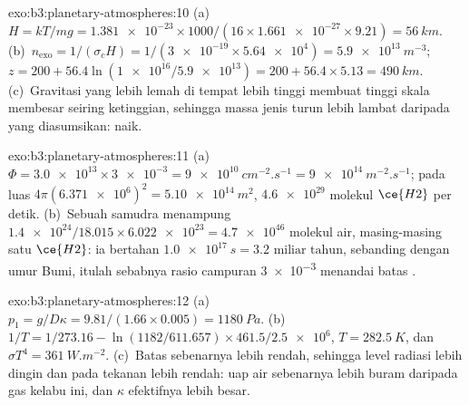 \begin{solution}{exo:b3:planetary-atmospheres:10}
(a)~$H = kT/mg = \num{1.381e-23}\times1000/(16\times\num{1.661e-27}\times9.21)
= \qty{56}{km}$. (b)~$n_\mathrm{exo} = 1/(\sigma_c H) = 1/(\num{3e-19}\times
\num{5.64e4}) = \qty{5.9e13}{m^{-3}}$; $z = 200 + 56.4\ln(\num{1e16}/
\num{5.9e13}) = 200 + 56.4\times5.13 = \qty{490}{km}$. (c)~Gravitasi yang lebih lemah
di tempat lebih tinggi membuat tinggi skala membesar seiring ketinggian, sehingga massa jenis
turun lebih lambat daripada yang diasumsikan:  naik.
\end{solution}

\begin{solution}{exo:b3:planetary-atmospheres:11}
(a)~$\Phi = \num{3.0e13}\times\num{3e-3} = \qty{9e10}{cm^{-2}.s^{-1}} =
\qty{9e14}{m^{-2}.s^{-1}}$; pada luas $4\pi(\num{6.371e6})^2 =
\qty{5.10e14}{m^2}$, $\num{4.6e29}$ molekul $\ce{H2}$ per detik.
(b)~Sebuah samudra menampung $\num{1.4e24}/18.015\times\num{6.022e23} =
\num{4.7e46}$ molekul air, masing-masing satu $\ce{H2}$: ia bertahan
$\qty{1.0e17}{s} = \num{3.2}\text{ miliar tahun}$, sebanding dengan umur
Bumi, itulah sebabnya rasio campuran \num{3e-3} menandai batas .
\end{solution}

\begin{solution}{exo:b3:planetary-atmospheres:12}
(a)~$p_1 = g/D\kappa = 9.81/(1.66\times0.005) = \qty{1180}{Pa}$.
(b)~$1/T = 1/273.16 - \ln(1182/611.657)\times461.5/\num{2.5e6}$, $T =
\qty{282.5}{K}$, dan $\sigma T^4 = \qty{361}{W.m^{-2}}$. (c)~Batas sebenarnya
lebih rendah, sehingga level radiasi lebih dingin dan pada tekanan lebih rendah: uap air
sebenarnya lebih buram daripada gas kelabu ini, dan $\kappa$ efektifnya
lebih besar.
\end{solution}

